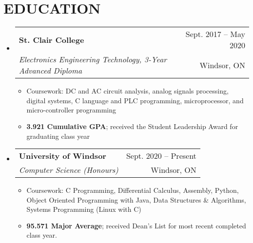 \documentclass[letterpaper,11pt]{article}
\makeatletter
\newcommand{\resumeItem}[1]{
  \item\small{
    {#1 \vspace{-1pt}}
  }
}
\newcommand{\resumeSubheading}[4]{
  \vspace{-1pt}\item
    \begin{tabular*}{\textwidth}[t]{l@{\extracolsep{\fill}}r}
      \textbf{#1} & {\color{dark-grey}\small #2}\vspace{1pt}\\ %
      \textit{#3} & {\color{dark-grey} \small #4}\\ %
    \end{tabular*}\vspace{-4pt}
}
\newcommand{\resumeSubHeadingListStart}{\begin{itemize}[leftmargin=0in, label={}]}
\newcommand{\resumeSubHeadingListEnd}{\end{itemize}}
\newcommand{\resumeItemListStart}{\begin{itemize}}
\newcommand{\resumeItemListEnd}{\end{itemize}\vspace{0pt}}
\makeatother
\begin{document}
\section {EDUCATION}
  \resumeSubHeadingListStart
    \resumeSubheading
      {St. Clair College}{Sept. 2017 -- May 2020}
      {Electronics Engineering Technology, 3-Year Advanced Diploma}{Windsor, ON}
      	\resumeItemListStart
    	\resumeItem {Coursework: DC and AC circuit analysis, analog signals processing, digital systems, C language and PLC programming, microprocessor, and micro-controller programming}
    	\resumeItem {\textbf{3.921 Cumulative GPA}; received the Student Leadership Award for graduating class year}
        \resumeItemListEnd
  \resumeSubHeadingListEnd
  
  \resumeSubHeadingListStart
    \resumeSubheading
      {University of Windsor}{Sept. 2020 -- Present}
      {Computer Science (Honours)}{Windsor, ON}
      	\resumeItemListStart
    	\resumeItem {Coursework: C Programming, Differential Calculus, Assembly, Python, Object Oriented Programming with Java, Data Structures \& Algorithms, Systems Programming (Linux with C)}
    	\resumeItem {\textbf{95.571 Major Average}; received Dean's List for most recent completed class year.}
        \resumeItemListEnd
  \resumeSubHeadingListEnd


%


\end{document}
